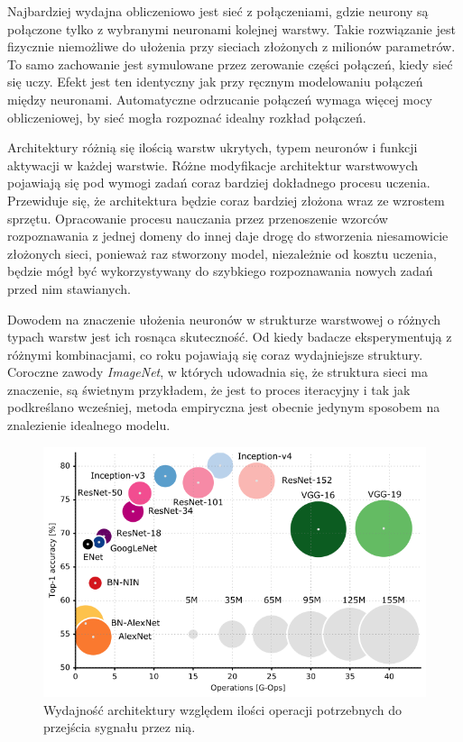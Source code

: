 \documentclass[12pt,a4paper,twoside,titlepage,openright]{book}
\begin{document}
Najbardziej wydajna obliczeniowo jest sieć z połączeniami, gdzie neurony są połączone tylko z wybranymi neuronami kolejnej warstwy. Takie rozwiązanie jest fizycznie niemożliwe do ułożenia przy sieciach złożonych z milionów parametrów. To samo zachowanie jest symulowane przez zerowanie części połączeń, kiedy sieć się uczy. Efekt jest ten identyczny jak przy ręcznym modelowaniu połączeń między neuronami. Automatyczne odrzucanie połączeń wymaga więcej mocy obliczeniowej, by sieć mogła rozpoznać idealny rozkład połączeń.

Architektury różnią się ilością warstw ukrytych, typem neuronów i funkcji aktywacji w każdej warstwie.
Różne modyfikacje architektur warstwowych pojawiają się pod wymogi zadań coraz bardziej dokładnego procesu uczenia. Przewiduje się, że architektura będzie coraz bardziej złożona wraz ze wzrostem sprzętu. Opracowanie procesu nauczania przez przenoszenie wzorców rozpoznawania z jednej domeny do innej daje drogę do stworzenia niesamowicie złożonych sieci, ponieważ raz stworzony model, niezależnie od kosztu uczenia, będzie mógł być wykorzystywany do szybkiego rozpoznawania nowych zadań przed nim stawianych.

Dowodem na znaczenie ułożenia neuronów w strukturze warstwowej o różnych typach warstw jest ich rosnąca skuteczność. Od kiedy badacze eksperymentują z różnymi kombinacjami, co roku pojawiają się coraz wydajniejsze struktury. Coroczne zawody \textit{ImageNet}, w których udowadnia się, że struktura sieci ma znaczenie, są świetnym przykładem, że jest to proces iteracyjny i tak jak podkreślano wcześniej, metoda empiryczna jest obecnie jedynym sposobem na znalezienie idealnego modelu.

\begin{figure}[h]
	\centering
			\includegraphics[resolution=100, scale=0.6]{architecturePerformance.png}
		\caption{Wydajność architektury względem ilości operacji potrzebnych do przejścia sygnału przez nią.}
\end{figure}
\end{document}
